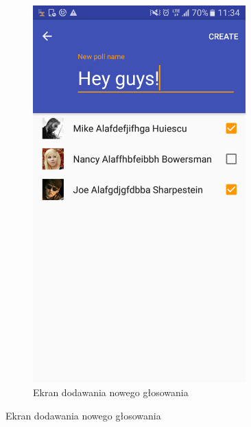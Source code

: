 \documentclass[10pt,a4paper]{article}
\begin{document}
\begin{figure}
\begin{subfigure}[t]{0.4\textwidth}
		\includegraphics[width=0.9\textwidth]{screen2.png}
		\caption{Ekran dodawania nowego głosowania}
	\end{subfigure}


\end{figure}
\end{document}
